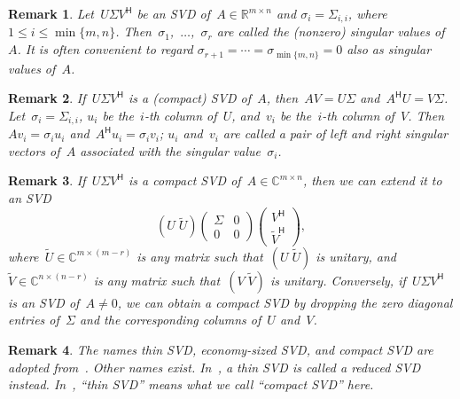 \documentclass[11pt,a4paper]{article}  %
\numberwithin{equation}{section}
\newtheorem{remark}{Remark}%
\theoremstyle{definition}
\def\RR{\mathbb{R}}
\def\CC{\mathbb{C}}
\newcommand{\hmt}{{\scriptscriptstyle{{\mathsf{H}}}}}
\begin{document}
\begin{remark}
  Let~$U\Sigma V^\hmt$ be an SVD of~$A\in \RR^{m\times n}$ and $\sigma_i
  = \Sigma_{i,i}$, where $1\le i\le \min\{m,n\}$. Then~\mbox{$\sigma_1$, $\dots$, $\sigma_r$} are called the
  \textnormal{(}nonzero\textnormal{)} singular values of~$A$. It is often convenient to
  regard $\sigma_{r+1}=\cdots=\sigma_{\min\{m,n\}} = 0$ also as singular values of~$A$.
\end{remark}

\begin{remark}
If~$U\Sigma V^\hmt$ is a \textnormal{(}compact\textnormal{)} SVD
of~$A$, then~$AV = U\Sigma$ and~$A^\hmt U = V\Sigma$.
Let~$\sigma_i=\Sigma_{i,i}$, $u_i$ be the~$i$-th column of~$U$,
and~$v_i$ be the~$i$-th column of~$V$.
Then~$A v_i = \sigma_i u_i$ and~$A^\hmt u_i = \sigma_i v_i$; $u_i$ and~$v_i$
are called a pair of left and right singular vectors of~$A$ associated with the
singular value~$\sigma_{i}$.
\end{remark}

\begin{remark}
  If~$U \Sigma V^\hmt$ is a compact SVD of~$A \in \CC^{m\times n}$,
  then we can extend it to an SVD
  \begin{equation*}
    (U \; \tilde{U})
    \begin{pmatrix}
      \Sigma & 0\\
      0 & 0
    \end{pmatrix}
    \begin{pmatrix}
      V^\hmt\\
      \tilde{V}^\hmt
    \end{pmatrix},
  \end{equation*}
  where~$\tilde{U}\in \CC^{m\times(m-r)}$ is any matrix such that~$(U \; \tilde{U})$ is unitary,
  and~$\tilde{V} \in \CC^{n\times (n-r)}$ is any matrix such that~$(V \; \tilde{V})$ is unitary.
  Conversely, if~$U\Sigma V^\hmt$ is an SVD of~$A\neq 0$, we can obtain a compact
  SVD by dropping the zero diagonal entries of~$\Sigma$ and the
  corresponding columns of~$U$ and~$V$.
\end{remark}

\begin{remark}
    The names \emph{thin} SVD, \emph{economy-sized} SVD, and \emph{compact} SVD are adopted
    from~\cite[Section~6.1]{Bai_etal_2000}.
    Other names exist.
    In~\cite[Lecture~4]{Trefethen_Bau_1997}, a thin SVD is called a \emph{reduced} SVD instead.
    In~\cite[Theorem~7.3.2.]{Horn_Johnson_2012}, ``thin SVD'' means what we call ``compact SVD''
    here.
\end{remark}
\end{document}
